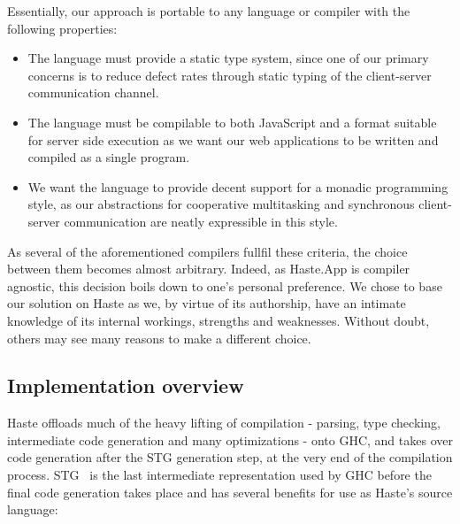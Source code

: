 \documentclass[preprint]{sigplanconf}
\begin{document}
Essentially, our approach is portable to any language or compiler with the
following properties:

\begin{itemize}
  \item The language must provide a static type system, since one of our
        primary concerns is to reduce defect rates through static typing of
        the client-server communication channel.
  \item The language must be compilable to both JavaScript and a format
        suitable for server side execution as we want our web applications
        to be written and compiled as a single program.
  \item We want the language to provide decent support for a monadic
        programming style, as our abstractions for cooperative multitasking
        and synchronous client-server communication are neatly expressible in
        this style.
\end{itemize}

As several of the aforementioned compilers fullfil these criteria, the
choice between them becomes almost arbitrary. Indeed, as Haste.App is compiler
agnostic, this decision boils down to one's personal preference. We chose to
base our solution on Haste as we, by virtue of its authorship, have an intimate
knowledge of its internal workings, strengths and weaknesses.
Without doubt, others may see many reasons to make a different choice.

\subsection{Implementation overview}

Haste offloads much of the heavy lifting of compilation - parsing,
type checking, intermediate code generation and many optimizations - onto GHC,
and takes over code generation after the STG generation step, at the very end
of the compilation process. STG\ \cite{stg} is the last intermediate
representation used by GHC before the final code generation takes place and
has several benefits for use as Haste's source language:
\end{document}
